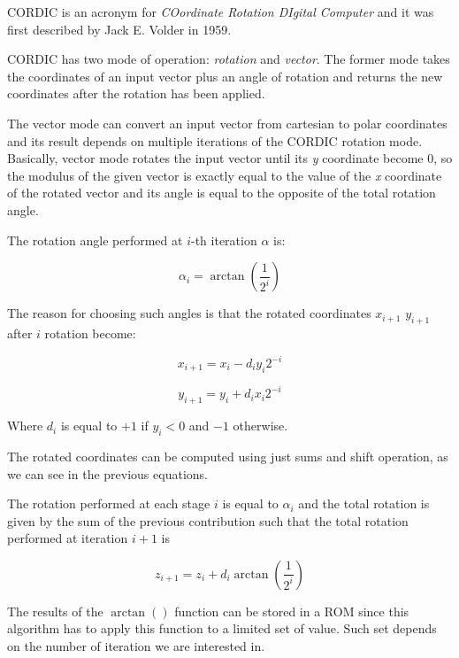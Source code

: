 \documentclass[12pt,a4paper]{report}
\begin{document}
CORDIC is an acronym for \emph{COordinate Rotation DIgital Computer} and it was first described by Jack E. Volder in 1959.

CORDIC has two mode of operation: \emph{rotation} and \emph{vector}. The former mode takes the coordinates of an input vector plus an angle of rotation and returns the new coordinates after the rotation has been applied.

The vector mode can convert an input vector from cartesian to polar coordinates and its result depends on multiple iterations of the CORDIC rotation mode. Basically, vector mode rotates the input vector until its \emph{y} coordinate become 0, so the modulus of the given vector is exactly equal to the value of the \emph{x} coordinate of the rotated vector and its angle is equal to the opposite of the total rotation angle.

The rotation angle performed at $i$-th iteration $\alpha$ is:

\begin{equation}
\alpha_{i} = \arctan \left(\dfrac{1}{2^i}\right)
\end{equation}

The reason for choosing such angles is that the rotated coordinates $x_{i+1}$ $y_{i+1}$  after $i$ rotation become:

\begin{equation}
x_{i+1} = x_{i} - d_{i} y_{i}  2^{-i}
\end{equation}

\begin{equation}
y_{i+1} = y_{i} + d_{i} x_{i} 2^{-i}
\end{equation}

Where $d_{i}$ is equal to $+1$ if $y_{i} < 0$ and $-1$ otherwise.

The rotated coordinates can be computed using just sums and shift operation, as we can see in the previous equations.

The rotation performed at each stage $i$ is equal to $\alpha_{i}$ and the total rotation is given by the sum of the previous contribution such that the total rotation performed at iteration $i+1$ is

\begin{equation}
z_{i+1} = z_{i} + d_{i} \arctan \left(\dfrac{1}{2^i}\right)
\end{equation}

The results of the $\arctan()$ function can be stored in a ROM since this algorithm has to apply this function to a limited set of value. Such set depends on the number of iteration we are interested in.
\end{document}
